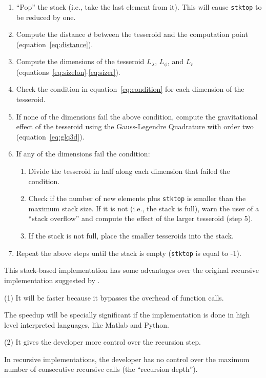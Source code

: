 \documentclass[paper,twocolumn]{geophysics}
\begin{document}
\begin{enumerate}
    \item ``Pop'' the stack (i.e., take the last element from it).
        This will cause \texttt{stktop} to be reduced by one.
    \item Compute the distance $d$ between the tesseroid and
        the computation point (equation~\ref{eq:distance}).
    \item Compute the dimensions of the tesseroid $L_\lambda$, $L_\phi$,
        and $L_r$ (equations~\ref{eq:sizelon}-\ref{eq:sizer}).
    \item Check the condition in equation~\ref{eq:condition} for each
        dimension of the tesseroid.
    \item If none of the dimensions fail the above condition,
        compute the gravitational effect of the tesseroid using the
        Gauss-Legendre Quadrature with order two
        (equation~\ref{eq:glq3d}).
    \item If any of the dimensions fail the condition:
    \begin{enumerate}
        \item Divide the tesseroid in half along each dimension that failed
             the condition.
        \item Check if the number of new elements plus \texttt{stktop}
             is smaller than the maximum stack size.
             If it is not (i.e., the stack is full),
             warn the user of a ``stack overflow''
             and compute the effect of the larger tesseroid (step 5).
        \item If the stack is not full, place the smaller tesseroids into
             the stack.
    \end{enumerate}
    \item Repeat the above steps until the stack is empty
        (\texttt{stktop} is equal to -1).
\end{enumerate}


This stack-based implementation has some advantages over the original recursive
implementation suggested by \citet{Li2011}.

(1) It will be faster because it bypasses the overhead of function calls.

The speedup will be specially significant if the implementation is done
in high level interpreted languages, like Matlab and Python.

(2) It gives the developer more control over the recursion step.

In recursive implementations,
the developer has no control over the maximum number of consecutive
recursive calls (the ``recursion depth'').
\end{document}
